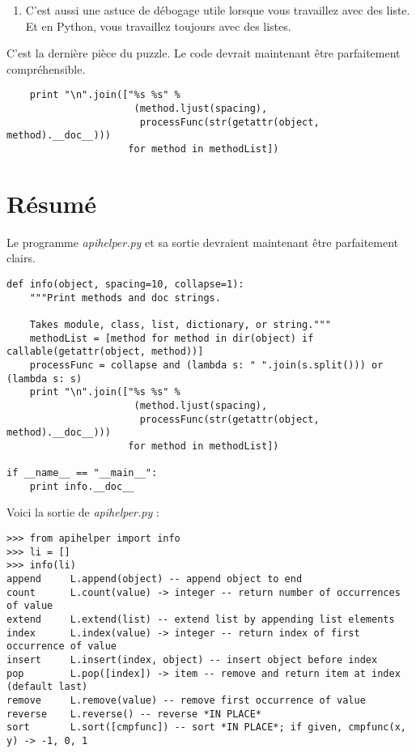 \begin{enumerate}
    \item C’est aussi une astuce de débogage utile lorsque vous travaillez avec des liste. Et en Python, vous travaillez toujours avec des listes.
\end{enumerate}

C’est la dernière pièce du puzzle. Le code devrait maintenant être parfaitement compréhensible.

\begin{lstlisting}
    print "\n".join(["%s %s" %
                      (method.ljust(spacing),
                       processFunc(str(getattr(object, method).__doc__)))
                     for method in methodList])
\end{lstlisting}

\section{Résumé}

Le programme \emph{apihelper.py} et sa sortie devraient maintenant être parfaitement clairs.

\begin{lstlisting}
def info(object, spacing=10, collapse=1):
    """Print methods and doc strings.

    Takes module, class, list, dictionary, or string."""
    methodList = [method for method in dir(object) if callable(getattr(object, method))]
    processFunc = collapse and (lambda s: " ".join(s.split())) or (lambda s: s)
    print "\n".join(["%s %s" %
                      (method.ljust(spacing),
                       processFunc(str(getattr(object, method).__doc__)))
                     for method in methodList])

if __name__ == "__main__":
    print info.__doc__
\end{lstlisting}

Voici la sortie de \emph{apihelper.py} :

\begin{lstlisting}
>>> from apihelper import info
>>> li = []
>>> info(li)
append     L.append(object) -- append object to end
count      L.count(value) -> integer -- return number of occurrences of value
extend     L.extend(list) -- extend list by appending list elements
index      L.index(value) -> integer -- return index of first occurrence of value
insert     L.insert(index, object) -- insert object before index
pop        L.pop([index]) -> item -- remove and return item at index (default last)
remove     L.remove(value) -- remove first occurrence of value
reverse    L.reverse() -- reverse *IN PLACE*
sort       L.sort([cmpfunc]) -- sort *IN PLACE*; if given, cmpfunc(x, y) -> -1, 0, 1
\end{lstlisting}

